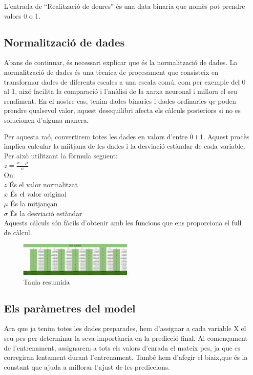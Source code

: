 L'entrada de ``Realització de deures'' és una data binaria que nomès pot prendre valors 0 o 1.
\subsection{Normalització de dades}
Abans de continuar, és necessari explicar que és la normalització de dades.
La normalització de dades és una tècnica de procesament que consisteix en transformar dades de diferents escales a una escala comú, com per exemple del 0 al 1, aixó facilita la comparació i l'anàlisi de la xarxa neuronal i millora el seu rendiment. En el nostre cas, tenim dades binaries i dades ordinaries qe poden prendre qualsevol valor, aquest desequilibri afecta els càlculs posteriors si no es solucionen d'alguna manera.

Per aquesta raó, convertirem totes les dades en valors d'entre 0 i 1. Aquest procès implica calcular la miitjana de les dades i la desviació estàndar de cada variable. Per això utilitzant la fòrmula seguent:\\
$z = \frac{x - \mu}{\sigma}$\\

On:\\
$z$ És el valor normalitzat\\
$x$ És el valor original\\
$\mu$ És la mitjançan\\
$\sigma$ És la desviació estàndar\\

Aquests càlculs són fàcils d'obtenir amb les funcions que ens proporciona el full de càlcul.

\begin{figure}[H]
    \centering
    \includegraphics[width=0.5\textwidth]{./figures/Dades_normalitzades.png}
    \caption{Taula resumida}
\end{figure}

\subsection{Els paràmetres del model}
Ara que ja tenim totes les dades preparades, hem d'assignar a cada variable X el seu pes per determinar la seva importància en la predicció final. Al començament de l'entrenament, assignarem a tots els valors d'enrada el mateix pes, ja que es corregiran lentament durant l'entrenament.
També hem d'afegir el biaix,que és la constant que ajuda a millorar l'ajust de les prediccions.

